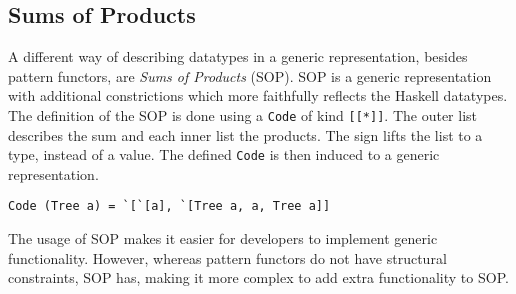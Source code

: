 \subsection{Sums of Products}
A different way of describing datatypes in a generic representation, besides pattern functors, are \textit{Sums of Products}\cite{vries2014sums} (SOP). SOP is a generic representation with additional constrictions which more faithfully reflects the Haskell datatypes. The definition of the SOP is done using a \texttt{Code} of kind \texttt{[[*]]}. The outer list describes the sum and each inner list the products. The  sign lifts the list to a type, instead of a value. The defined \texttt{Code} is then induced to a generic representation. 

\begin{verbatim}
Code (Tree a) = `[`[a], `[Tree a, a, Tree a]]
\end{verbatim}

The usage of SOP makes it easier for developers to implement generic functionality. However, whereas pattern functors do not have structural constraints, SOP has, making it more complex to add extra functionality to SOP.